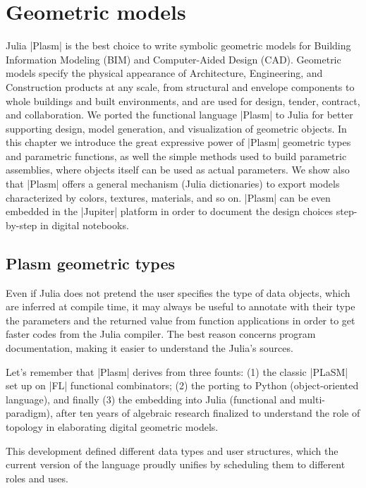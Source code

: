 
\chapter{Geometric models}
\label{chapt:4}

Julia |Plasm| is the best choice to write symbolic geometric models for Building Information Modeling (BIM) and Computer-Aided Design (CAD).  Geometric models specify the physical appearance of Architecture, Engineering, and Construction products at any scale, from structural and envelope components to whole buildings and built environments, and are used for design, tender, contract, and collaboration. We ported the  functional language |Plasm| to Julia for better supporting design, model generation, and visualization of geometric objects.
In this chapter we introduce the great expressive power of |Plasm| geometric types and parametric functions, as well the simple methods used to build parametric assemblies, where objects itself can be used as actual parameters. We show also that |Plasm| offers a  general mechanism (Julia dictionaries) to export models characterized by colors, textures, materials, and so on. |Plasm| can be even embedded in the |Jupiter| platform in order to document the design choices step-by-step in digital notebooks.

\section{Plasm geometric types}\label{sect:4-1}

Even if Julia does not pretend the user specifies the type of data objects, which are inferred at compile time, it may always be useful to annotate with their type the parameters and the returned value from function applications in order to get faster codes from the Julia compiler. The best reason concerns program documentation, making it easier to understand the Julia's sources.

Let's remember that |Plasm| derives from three founts: (1) the classic |PLaSM| set up on |FL| functional combinators; (2) the porting to Python (object-oriented language), and finally (3) the embedding into Julia (functional and multi-paradigm), after ten years of algebraic research finalized to understand the role of topology in elaborating digital  geometric models. 

This development defined different data types and user structures, which the current version of the language proudly unifies by scheduling them to different roles and uses.
 

